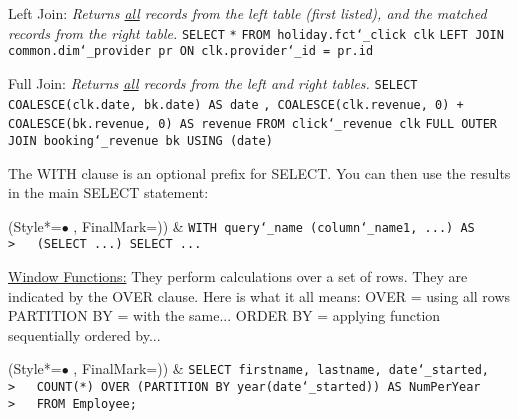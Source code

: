 \vspace{\baselineskip}
Left Join:\newline
\textit{Returns \underline{all} records from the left table (first listed), and the matched records from the right table.}\newline
\texttt{SELECT}\newline
\texttt{*}\newline
\texttt{FROM holiday.fct\char`_click clk}\newline
\texttt{LEFT JOIN common.dim\char`_provider pr ON clk.provider\char`_id = pr.id}

\vspace{\baselineskip}
Full Join:\newline
\textit{Returns \underline{all} records from the left and right tables.}\newline
\texttt{SELECT}\newline
\texttt{COALESCE(clk.date, bk.date) AS date}\newline
\texttt{, COALESCE(clk.revenue, 0) + COALESCE(bk.revenue, 0) AS revenue}\newline
\texttt{FROM click\char`_revenue clk}\newline
\texttt{FULL OUTER JOIN booking\char`_revenue bk USING (date)}



The WITH clause is an optional prefix for SELECT.
You can then use the results in the main SELECT statement:
\begin{easylist}[itemize]
\ListProperties(Style*=$\bullet$ , FinalMark={)})
& \texttt{WITH query\char`_name (column\char`_name1, ...) AS\newline
>~~~(SELECT ...)\newline
SELECT ...}
\end{easylist}

\underline{Window Functions:}\newline
They perform calculations over a set of rows.
They are indicated by the OVER clause.\newline
\newline
Here is what it all means:\newline
OVER = using all rows\newline
PARTITION BY = with the same...\newline
ORDER BY = applying function sequentially ordered by...
% 
\begin{easylist}[itemize]
\ListProperties(Style*=$\bullet$ , FinalMark={)})
& \texttt{SELECT firstname, lastname, date\char`_started,\newline
>~~~COUNT(*) OVER (PARTITION BY year(date\char`_started)) AS NumPerYear\newline
>~~~FROM Employee;}
\end{easylist}

\newpage